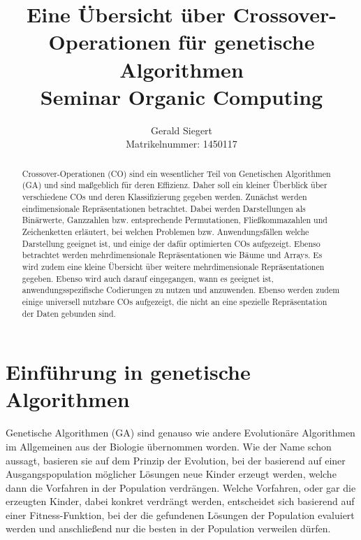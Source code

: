 \documentclass{llncs}
\begin{document}
\mainmatter

\title{Eine Übersicht über Crossover-Operationen für genetische Algorithmen\\Seminar Organic Computing}

\author{Gerald Siegert\\Matrikelnummer: 1450117}
\tocauthor{}


\maketitle


\begin{abstract}
	Crossover-Operationen (CO) sind ein wesentlicher Teil von Genetischen Algorithmen (GA) und sind maßgeblich für deren Effizienz. Daher soll ein kleiner Überblick über verschiedene COs und deren Klassifizierung gegeben werden. Zunächst werden eindimensionale Re\-prä\-sen\-ta\-ti\-on\-en betrachtet. Dabei werden Darstellungen als Binärwerte, Ganzzahlen bzw. entsprechende Permutationen, Fließkommazahlen und Zeichenketten erläutert, bei welchen Problemen bzw. Anwendungsfällen welche Darstellung geeignet ist, und einige der dafür optimierten COs aufgezeigt. Ebenso betrachtet werden mehrdimensionale Re\-prä\-sen\-ta\-ti\-on\-en wie Bäume und Arrays. Es wird zudem eine kleine Über\-sicht über weitere mehrdimensionale Repräsentationen gegeben. Ebenso wird auch darauf eingegangen, wann es geeignet ist, anwendungsspezifische Co\-die\-rungen zu nutzen und anzuwenden. Ebenso werden zudem einige universell nutzbare COs aufgezeigt, die nicht an eine spezielle Repräsentation der Daten gebunden sind.
\end{abstract}

\pagebreak

\section{Einführung in genetische Algorithmen}
\label{sec:EinfuhrungGA}

	Genetische Algorithmen (GA) sind genauso wie andere Evolutionäre Algorithmen im Allgemeinen aus der Biologie übernommen worden. Wie der Name schon aussagt, basieren sie auf dem Prinzip der Evolution, bei der basierend auf einer Ausgangspopulation möglicher Lösungen neue Kinder erzeugt werden, welche dann die Vorfahren in der Population verdrängen. Welche Vorfahren, oder gar die erzeugten Kinder, dabei konkret verdrängt werden, entscheidet sich basierend auf einer Fitness-Funktion, bei der die gefundenen Lösungen der Population evaluiert werden und anschließend nur die besten in der Population verweilen dürfen.
	
\end{document}
